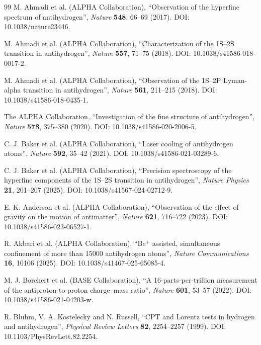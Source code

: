 \documentclass[11pt,a4paper]{article}
\begin{document}
\begin{thebibliography}{99}
M. Ahmadi et al. (ALPHA Collaboration), \enquote{Observation of the hyperfine spectrum of antihydrogen}, \emph{Nature} \textbf{548}, 66--69 (2017). DOI: 10.1038/nature23446.

M. Ahmadi et al. (ALPHA Collaboration), \enquote{Characterization of the 1S--2S transition in antihydrogen}, \emph{Nature} \textbf{557}, 71--75 (2018). DOI: 10.1038/s41586-018-0017-2.

M. Ahmadi et al. (ALPHA Collaboration), \enquote{Observation of the 1S--2P Lyman-alpha transition in antihydrogen}, \emph{Nature} \textbf{561}, 211--215 (2018). DOI: 10.1038/s41586-018-0435-1.

The ALPHA Collaboration, \enquote{Investigation of the fine structure of antihydrogen}, \emph{Nature} \textbf{578}, 375--380 (2020). DOI: 10.1038/s41586-020-2006-5.

C. J. Baker et al. (ALPHA Collaboration), \enquote{Laser cooling of antihydrogen atoms}, \emph{Nature} \textbf{592}, 35--42 (2021). DOI: 10.1038/s41586-021-03289-6.

C. J. Baker et al. (ALPHA Collaboration), \enquote{Precision spectroscopy of the hyperfine components of the 1S--2S transition in antihydrogen}, \emph{Nature Physics} \textbf{21}, 201--207 (2025). DOI: 10.1038/s41567-024-02712-9.

E. K. Anderson et al. (ALPHA Collaboration), \enquote{Observation of the effect of gravity on the motion of antimatter}, \emph{Nature} \textbf{621}, 716--722 (2023). DOI: 10.1038/s41586-023-06527-1.

R. Akbari et al. (ALPHA Collaboration), \enquote{Be$^{+}$ assisted, simultaneous confinement of more than 15000 antihydrogen atoms}, \emph{Nature Communications} \textbf{16}, 10106 (2025). DOI: 10.1038/s41467-025-65085-4.

M. J. Borchert et al. (BASE Collaboration), \enquote{A 16-parts-per-trillion measurement of the antiproton-to-proton charge--mass ratio}, \emph{Nature} \textbf{601}, 53--57 (2022). DOI: 10.1038/s41586-021-04203-w.

R. Bluhm, V. A. Kostelecky and N. Russell, \enquote{CPT and Lorentz tests in hydrogen and antihydrogen}, \emph{Physical Review Letters} \textbf{82}, 2254--2257 (1999). DOI: 10.1103/PhysRevLett.82.2254.


\end{thebibliography}
\end{document}
